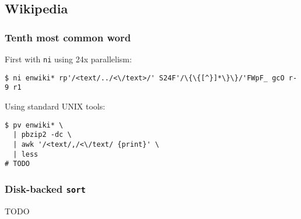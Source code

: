 \subsection{Wikipedia}
\subsubsection{Tenth most common word}
First with {\tt ni} using 24x parallelism:

\begin{verbatim}
$ ni enwiki* rp'/<text/../<\/text>/' S24F'/\{\{[^}]*\}\}/'FWpF_ gcO r-9 r1\end{verbatim}

Using standard UNIX tools:

\begin{verbatim}
$ pv enwiki* \
  | pbzip2 -dc \
  | awk '/<text/,/<\/text/ {print}' \
  | less
# TODO
\end{verbatim}

\subsubsection{Disk-backed {\tt sort}}
TODO
